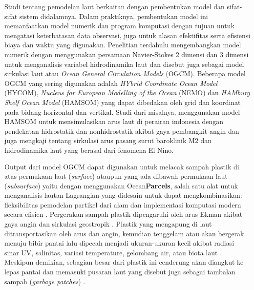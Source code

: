 \begin{spacing}{1.5}
	
	Studi tentang pemodelan laut berkaitan dengan pembentukan model dan sifat-sifat sistem didalamnya. Dalam praktiknya, pembentukan model ini memanfaatkan model numerik dan program komputasi dengan tujuan untuk mengatasi keterbatasan data observasi, juga untuk alasan efektifitas serta efisiensi biaya dan waktu yang digunakan. Penelitian terdahulu mengembangkan model numerik dengan menggunakan persamaan Navier-Stokes 2 dimensi dan 3 dimensi untuk menganalisis variabel hidrodinamika laut dan disebut juga sebagai model sirkulasi laut atau \textit{Ocean General Circulation Models} (OGCM). Beberapa model OGCM yang sering digunakan adalah \textit{HYbrid Coordinate Ocean Model} (HYCOM), \textit{Nucleus for European Modelling of the Ocean} (NEMO) dan \textit{HAMburg Shelf Ocean Model} (HAMSOM) yang dapat dibedakan oleh grid dan koordinat pada bidang horizontal dan vertikal. Studi dari  misalnya, menggunakan model HAMSOM untuk mensimulasikan arus laut di perairan indonesia dengan pendekatan hidrostatik dan nonhidrostatik akibat gaya pembangkit angin dan juga mengkaji tentang sirkulasi arus pasang surut baroklinik M2 dan hidrodinamika laut yang berasal dari fenomena El Nino. \par
	
	Output dari model OGCM dapat digunakan untuk melacak sampah plastik di atas permukaan laut (\textit{surface})  ataupun yang ada dibawah permukaan laut (\textit{subsurface}) yaitu dengan menggunakan Ocean\textbf{Parcels}, salah satu alat untuk menganalisis lautan Lagrangian yang didesain untuk dapat mengkombinasikan: fleksibilitas pemodelan partikel dari alam dan implementasi komputasi modern secara efisien . Pergerakan sampah plastik dipengaruhi oleh arus Ekman akibat gaya angin dan sirkulasi geostropik . Plastik yang mengapung di laut ditransportasikan oleh arus dan angin, kemudian tenggelam atau akan bergerak menuju bibir pantai lalu dipecah menjadi ukuran-ukuran kecil akibat radiasi sinar UV, salinitas, variasi temperature, gelombang air, atau biota laut . Meskipun demikian, sebagian besar dari plastik ini cenderung akan diangkut ke lepas pantai dan memasuki pusaran laut yang disebut juga sebagai tambalan sampah (\textit{garbage patches}) .
	

\end{spacing}
